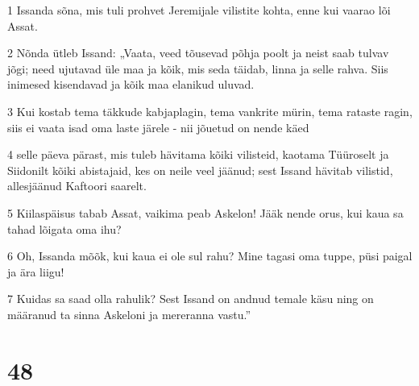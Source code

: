 \par 1 Issanda sõna, mis tuli prohvet Jeremijale vilistite kohta, enne kui vaarao lõi Assat.
\par 2 Nõnda ütleb Issand: „Vaata, veed tõusevad põhja poolt ja neist saab tulvav jõgi; need ujutavad üle maa ja kõik, mis seda täidab, linna ja selle rahva. Siis inimesed kisendavad ja kõik maa elanikud uluvad.
\par 3 Kui kostab tema täkkude kabjaplagin, tema vankrite mürin, tema rataste ragin, siis ei vaata isad oma laste järele - nii jõuetud on nende käed
\par 4 selle päeva pärast, mis tuleb hävitama kõiki vilisteid, kaotama Tüüroselt ja Siidonilt kõiki abistajaid, kes on neile veel jäänud; sest Issand hävitab vilistid, allesjäänud Kaftoori saarelt.
\par 5 Kiilaspäisus tabab Assat, vaikima peab Askelon! Jääk nende orus, kui kaua sa tahad lõigata oma ihu?
\par 6 Oh, Issanda mõõk, kui kaua ei ole sul rahu? Mine tagasi oma tuppe, püsi paigal ja ära liigu!
\par 7 Kuidas sa saad olla rahulik? Sest Issand on andnud temale käsu ning on määranud ta sinna Askeloni ja mereranna vastu.”

\chapter{48}

